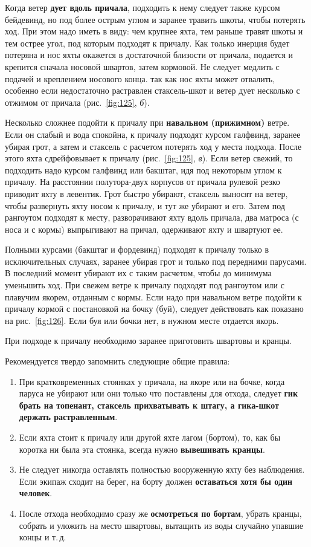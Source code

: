 \documentclass[a4paper, 12pt, twoside, final]{scrbook}
\begin{document}
Когда ветер \textbf{дует вдоль причала}, подходить к нему следует также курсом бейдевинд, но под более острым углом и заранее травить шкоты, чтобы потерять ход. При этом надо иметь в виду: чем крупнее яхта, тем раньше травят шкоты и тем острее угол, под которым подходят к причалу. Как только инерция будет потеряна и нос яхты окажется в достаточной близости от причала, подается и крепится сначала носовой швартов, затем кормовой. Не следует медлить с подачей и креплением носового конца. так как нос яхты может отвалить, особенно если недостаточно растравлен стаксель-шкот и ветер дует несколько с отжимом от причала (рис.~\ref{fig:125}, \textit{б}). 

Несколько сложнее подойти к причалу при \textbf{навальном (прижимном)} ветре. Если он слабый и вода спокойна, к причалу подходят курсом галфвинд, заранее убирая грот, а затем и стаксель с расчетом потерять ход у места подхода. После этого яхта сдрейфовывает к причалу (рис.~\ref{fig:125}, \textit{в}). Если ветер свежий, то подходить надо курсом галфвинд или бакштаг, идя под некоторым углом к причалу. На расстоянии полутора-двух корпусов от причала рулевой резко приводит яхту в левентик. Грот быстро убирают, стаксель выносят на ветер, чтобы развернуть яхту носом к причалу, и тут же убирают и его. Затем под рангоутом подходят к месту, разворачивают яхту вдоль причала, два матроса (с носа и с кормы) выпрыгивают на причал, одерживают яхту и швартуют ее.

Полными курсами (бакштаг и фордевинд) подходят к причалу только в исключительных случаях, заранее убирая грот и только под передними парусами. В последний момент убирают их с таким расчетом, чтобы до минимума уменьшить ход. При свежем ветре к причалу подходят под рангоутом или с плавучим якорем, отданным с кормы. Если надо при навальном ветре подойти к причалу кормой с постановкой на бочку (буй), следует действовать как показано на рис.~\ref{fig:126}. Если буя или бочки нет, в нужном месте отдается якорь.

При подходе к причалу необходимо заранее приготовить швартовы и кранцы.

Рекомендуется твердо запомнить следующие общие правила:

\begin{enumerate}
\item При кратковременных стоянках у причала, на якоре или на бочке, когда паруса не убирают или они только что поставлены для отхода, следует \textbf{гик брать на топенант, стаксель прихватывать к штагу, а гика-шкот держать растравленным}. 
\item Если яхта стоит к причалу или другой яхте лагом (бортом), то, как бы коротка ни была эта стоянка, всегда нужно \textbf{вывешивать кранцы}. 
\item Не следует никогда оставлять полностью вооруженную яхту без наблюдения. Если экипаж сходит на берег, на борту должен \textbf{оставаться хотя бы один человек}. 
\item После отхода необходимо сразу же \textbf{осмотреться по бортам}, убрать кранцы, собрать и уложить на место швартовы, вытащить из воды случайно упавшие концы и т.\,д.
\end{enumerate}
\end{document}
